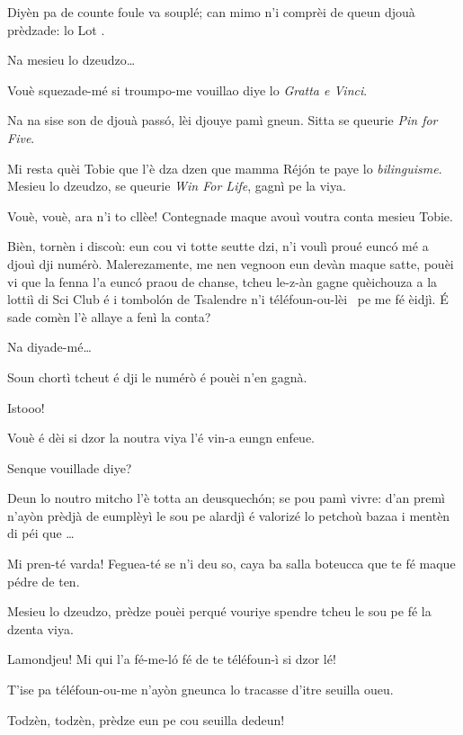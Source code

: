 \begin{drama}
\DzeudzoSenliquerspeaks Diyèn pa de counte foule va souplé; can mimo n’i comprèi de queun djouà prèdzade: lo Lot \lotto.

\Tobiespeaks Na mesieu lo dzeudzo\ldots

\DzeudzoSenliquerspeaks Vouè squezade-mé si troumpo-me vouillao diye lo \textit{Gratta e Vinci}.

\Tobiespeaks Na na sise son de djouà passó, lèi djouye pamì gneun. Sitta se queurie \textit{Pin for Five}.

\Bertinaspeaks Mi resta quèi Tobie que l’è dza dzen que mamma Réjón te paye lo \textit{bilinguisme}.  Mesieu lo dzeudzo, se queurie \textit{Win For Life}, gagnì pe la viya.

\DzeudzoSenliquerspeaks Vouè, vouè, ara n’i to cllèe! Contegnade maque avouì voutra conta mesieu Tobie.

\Tobiespeaks Bièn, tornèn i discoù: eun cou vi totte seutte dzi, n’i voulì proué eunc\'o mé a djouì  dji numérò. Malerezamente, me nen vegnoon eun devàn maque satte, pouèi vi que la fenna l'a eunc\'o praou de chanse, tcheu le-z-àn gagne quèichouza a la lottiì di Sci Club é i tombol\'on de Tsalendre n’i téléfoun-ou-lèi \chiamare\ pe me fé èidjì. É sade comèn l’è allaye a fenì la conta?

\DzeudzoSenliquerspeaks Na diyade-mé\ldots

\Tobiespeaks Soun chortì tcheut é dji le numérò é pouèi n’en gagnà.

\DzeudzoSenliquerspeaks Istooo!

\Bertinaspeaks Vouè é dèi si dzor la noutra viya l’é vin-a eungn enfeue.

\DzeudzoSenliquerspeaks Senque vouillade diye?

\Bertinaspeaks Deun lo noutro mitcho l’è totta an deusquechón; se pou pamì vivre: d'an premì n’ayòn prèdjà de eumplèyì le sou pe alardjì é valorizé lo petchoù bazaa i mentèn di péi que \ldots

\Tobiespeaks Mi pren-té varda! Feguea-té se n’i deu so, caya ba salla boteucca que te fé maque pédre de ten.

\Bertinaspeaks Mesieu lo dzeudzo, prèdze pouèi perqué vouriye spen\-dre tcheu le sou pe fé la dzenta viya.

\Tobiespeaks Lamondjeu! Mi qui l'a fé-me-l\'o fé de te téléfoun-ì si dzor lé!

\Bertinaspeaks T'ise pa téléfoun-ou-me n’ayòn gneunca lo tracasse d’itre seuilla oueu.

\DzeudzoSenliquerspeaks {} Todzèn, todzèn, prèdze eun pe cou seuilla dedeun!


\end{drama}
